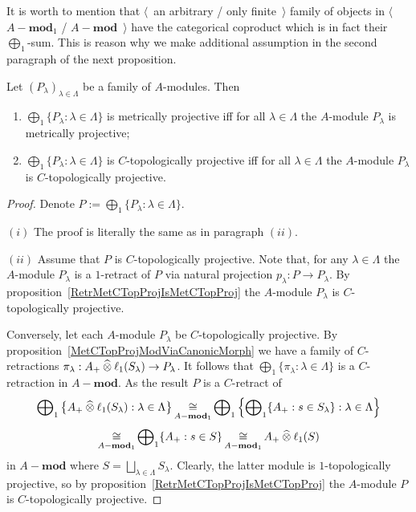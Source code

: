 It is worth to mention that $\langle$~an arbitrary / only finite~$\rangle$
family of objects in $\langle$~$A-\mathbf{mod}_1$ / $A-\mathbf{mod}$~$\rangle$
have the categorical coproduct which is in fact their $\bigoplus_1$-sum. This is
reason why we make additional assumption in the second paragraph of the next
proposition.

\begin{proposition}\label{MetTopProjModCoprod} Let
${(P_\lambda)}_{\lambda\in\Lambda}$ be a family of $A$-modules. Then 
\begin{enumerate}[label = (\roman*)]
    \item $\bigoplus_1 \{P_\lambda:\lambda\in\Lambda \}$ is metrically
    projective iff for all $\lambda\in\Lambda$ the $A$-module $P_\lambda$ is
    metrically projective;

    \item $\bigoplus_1 \{P_\lambda:\lambda\in\Lambda \}$ is $C$-topologically
    projective iff for all $\lambda\in\Lambda$ the $A$-module $P_\lambda$ is
    $C$-topologically projective.
\end{enumerate}
\end{proposition}
\begin{proof} Denote $P:=\bigoplus_1 \{P_\lambda:\lambda\in\Lambda \}$.

$(i)$ The proof is literally the same as in paragraph $(ii)$.

$(ii)$ Assume that $P$ is $C$-topologically projective. Note that, for any
$\lambda\in\Lambda$ the $A$-module $P_\lambda$ is a $1$-retract of $P$ via
natural projection $p_\lambda:P\to P_\lambda$. By
proposition~\ref{RetrMetCTopProjIsMetCTopProj} the $A$-module $P_\lambda$ is
$C$-topologically projective.

Conversely, let each $A$-module $P_\lambda$ be $C$-topologically projective. By
proposition~\ref{MetCTopProjModViaCanonicMorph} we have a family 
of $C$-retractions $\pi_\lambda:A_+\mathbin{\widehat{\otimes}}\ell_1(S_\lambda)\to P_\lambda$. 
It follows that
$\bigoplus_1 \{\pi_\lambda:\lambda\in\Lambda \}$ is a $C$-retraction in
$A-\mathbf{mod}$. As the result $P$ is a $C$-retract of 
$$
\bigoplus\nolimits_1\left \{A_+\mathbin{\widehat{\otimes}}
\ell_1(S_\lambda):\lambda\in\Lambda\right \} \mathop{\mathbin{\cong}}\limits_{A-\mathbf{mod}_1}
\bigoplus\nolimits_1\left \{\bigoplus\nolimits_1 \{A_+:s\in S_\lambda
\}:\lambda\in\Lambda\right \}
$$
$$
\mathop{\mathbin{\cong}}\limits_{A-\mathbf{mod}_1} \bigoplus\nolimits_1 \{A_+:s\in S \}
\mathop{\mathbin{\cong}}\limits_{A-\mathbf{mod}_1} A_+ \mathbin{\widehat{\otimes}} \ell_1(S)
$$
in $A-\mathbf{mod}$ where $S=\bigsqcup_{\lambda\in\Lambda}S_\lambda$. Clearly,
the latter module is $1$-topologically projective, so by
proposition~\ref{RetrMetCTopProjIsMetCTopProj} the $A$-module $P$ is 
$C$-topologically projective.
\end{proof}

